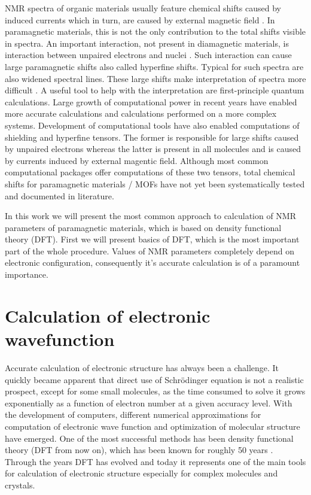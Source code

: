 \documentclass[openany, longbibliography,slovene,a4paper,12pt]{article}
\begin{document}
 NMR spectra of organic materials usually feature chemical shifts caused by
 induced currents which in turn, are caused by external magnetic field
 \cite{chemic_shift_tensor_review}. In paramagnetic materials, this is not the
 only contribution to the total shifts visible in spectra. An important
 interaction, not present in  diamagnetic materials, is interaction between
 unpaired electrons and nuclei
 \cite{Dft_Investigation_of_the_Effect_of_Spin_Orbit}.
 Such interaction can cause large paramagnetic
 shifts also called hyperfine shifts. Typical for such spectra are also widened
 spectral lines. These large shifts make interpretation of spectra more difficult
 \cite{Dft_Investigation_of_the_Effect_of_Spin_Orbit}. A useful tool to help
 with the interpretation are first-principle quantum calculations. Large growth
 of computational power in recent years have enabled more accurate calculations
 and calculations performed on a more complex systems. Development of
 computational tools have also enabled computations of shielding and hyperfine
 tensors. The former is responsible for large shifts caused by unpaired
 electrons whereas the latter is present in all molecules and is caused by
 currents induced by external magentic field. Although most common computational
 packages offer computations of these two tensors, total chemical shifts for paramagnetic materials / MOFs have not yet been systematically tested and documented in literature.

 In this work we will present the most common approach to calculation of NMR
 parameters of paramagnetic materials,  which is based on density functional
 theory (DFT). First we  will present basics of DFT, which is the most important part of the whole procedure. Values of NMR parameters completely depend on electronic configuration, consequently it's accurate calculation is of a paramount importance. 

\section{Calculation of electronic wavefunction}
Accurate calculation of electronic structure has always been a challenge. It
quickly became apparent that direct use of Schr{\"o}dinger equation is not a
realistic prospect, except for some small
molecules, as the time consumed to solve it grows exponentially
\cite{nobel_lecture} as a function of electron
number at a given accuracy level. With the development of computers, different
numerical approximations for computation of electronic wave function and
optimization of molecular structure have emerged. One of the most successful methods has been density functional theory
(DFT from now on), which has been known for roughly 50 years \cite{nobel_lecture}. Through the years DFT has evolved and today it represents one of the main tools for calculation of electronic structure especially for complex molecules and crystals.
\end{document}
